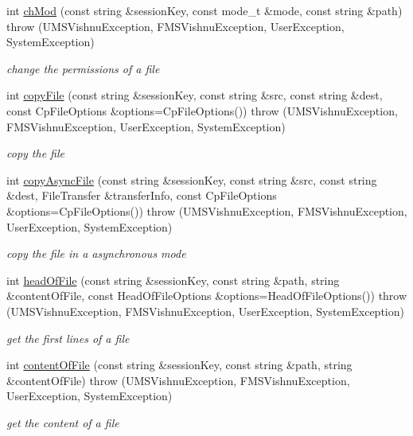 \begin{DoxyCompactItemize}
int \hyperlink{namespacevishnu_a88fa0cf47d649d26a520b6d84be734d0}{chMod} (const string \&sessionKey, const mode\_\-t \&mode, const string \&path)  throw (UMSVishnuException, FMSVishnuException, UserException, SystemException)
\begin{DoxyCompactList}\small\item\em change the permissions of a file \item\end{DoxyCompactList}\item 
int \hyperlink{namespacevishnu_a9c08b2960915cf530451df2c7e0d2316}{copyFile} (const string \&sessionKey, const string \&src, const string \&dest, const CpFileOptions \&options=CpFileOptions())  throw (UMSVishnuException, FMSVishnuException, UserException, SystemException)
\begin{DoxyCompactList}\small\item\em copy the file \item\end{DoxyCompactList}\item 
int \hyperlink{namespacevishnu_aa1f91396026194dd4f815035ec6b1f64}{copyAsyncFile} (const string \&sessionKey, const string \&src, const string \&dest, FileTransfer \&transferInfo, const CpFileOptions \&options=CpFileOptions())  throw (UMSVishnuException, FMSVishnuException, UserException, SystemException)
\begin{DoxyCompactList}\small\item\em copy the file in a asynchronous mode \item\end{DoxyCompactList}\item 
int \hyperlink{namespacevishnu_a2ce4c436458a99e531b2a2fe55c60854}{headOfFile} (const string \&sessionKey, const string \&path, string \&contentOfFile, const HeadOfFileOptions \&options=HeadOfFileOptions())  throw (UMSVishnuException, FMSVishnuException, UserException, SystemException)
\begin{DoxyCompactList}\small\item\em get the first lines of a file \item\end{DoxyCompactList}\item 
int \hyperlink{namespacevishnu_a626981a5333a6cf9980ecab82a130fe5}{contentOfFile} (const string \&sessionKey, const string \&path, string \&contentOfFile)  throw (UMSVishnuException, FMSVishnuException, UserException, SystemException)
\begin{DoxyCompactList}\small\item\em get the content of a file \item\end{DoxyCompactList}\item 

\end{DoxyCompactItemize}

